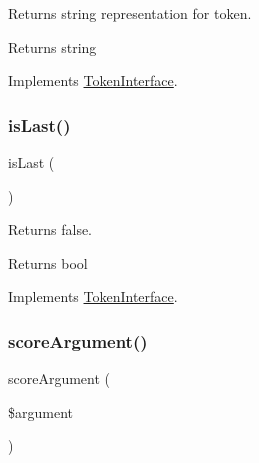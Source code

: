 Returns string representation for token.

\begin{DoxyReturn}{Returns}
string 
\end{DoxyReturn}


Implements \mbox{\hyperlink{interface_prophecy_1_1_argument_1_1_token_1_1_token_interface_a7516ca30af0db3cdbf9a7739b48ce91d}{Token\+Interface}}.

\mbox{\label{class_prophecy_1_1_argument_1_1_token_1_1_callback_token_ac72b8349b1340887fc1af30eca2b951c}} 
\subsubsection{\texorpdfstring{is\+Last()}{isLast()}}
{\footnotesize\ttfamily is\+Last (\begin{DoxyParamCaption}{ }\end{DoxyParamCaption})}

Returns false.

\begin{DoxyReturn}{Returns}
bool 
\end{DoxyReturn}


Implements \mbox{\hyperlink{interface_prophecy_1_1_argument_1_1_token_1_1_token_interface_ac72b8349b1340887fc1af30eca2b951c}{Token\+Interface}}.

\mbox{\label{class_prophecy_1_1_argument_1_1_token_1_1_callback_token_a8d5bf47ab6eaa935458d5ad160e52822}} 
\subsubsection{\texorpdfstring{score\+Argument()}{scoreArgument()}}
{\footnotesize\ttfamily score\+Argument (\begin{DoxyParamCaption}\item[{}]{\$argument }\end{DoxyParamCaption})}

